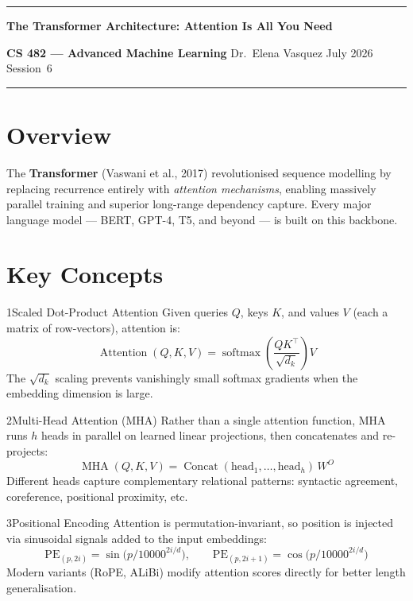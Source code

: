 \documentclass[11pt,a4paper]{article}
\newcommand{\handoutheader}[5]{%
  {\color{accent}\rule{\linewidth}{1.5pt}}\par\vspace{4pt}
  {\fontsize{16}{19}\selectfont\bfseries\color{neutral}#2}\par\vspace{3pt}
  \begingroup\small\color{neutral}
    \faUniversity\enspace\textbf{#1}\quad
    \faUser\enspace#3\quad
    \faCalendar\enspace#4\quad
    \faHashtag\enspace Session~#5
  \endgroup\par\vspace{4pt}
  {\color{accent}\rule{\linewidth}{0.6pt}}
  \vspace{6pt}
}
\begin{document}
\color{neutral}
\pagestyle{plain}

\handoutheader%
  {CS 482 — Advanced Machine Learning}%
  {The Transformer Architecture: Attention Is All You Need}%
  {Dr.\ Elena Vasquez}%
  {9 July 2026}%
  {6}

\section{Overview}

The \textbf{Transformer} (Vaswani et al., 2017) revolutionised sequence modelling
by replacing recurrence entirely with \emph{attention mechanisms}, enabling
massively parallel training and superior long-range dependency capture.
Every major language model — BERT, GPT-4, T5, and beyond — is built on this backbone.

\section{Key Concepts}

\begin{keybox}{1\enspace Scaled Dot-Product Attention}
Given queries \(Q\), keys \(K\), and values \(V\) (each a matrix of row-vectors),
attention is:
\[
  \operatorname{Attention}(Q,K,V)
  = \operatorname{softmax}\!\left(\frac{QK^{\top}}{\sqrt{d_k}}\right)V
\]
The \(\sqrt{d_k}\) scaling prevents vanishingly small softmax gradients when the
embedding dimension is large.
\end{keybox}

\vspace{5pt}

\begin{keybox}{2\enspace Multi-Head Attention (MHA)}
Rather than a single attention function, MHA runs \(h\) heads in parallel on
learned linear projections, then concatenates and re-projects:
\[
  \operatorname{MHA}(Q,K,V)
  = \operatorname{Concat}(\mathrm{head}_1,\ldots,\mathrm{head}_h)\,W^{O}
\]
Different heads capture complementary relational patterns: syntactic agreement,
coreference, positional proximity, etc.
\end{keybox}

\vspace{5pt}

\begin{keybox}{3\enspace Positional Encoding}
Attention is permutation-invariant, so position is injected via sinusoidal signals
added to the input embeddings:
\[
  \mathrm{PE}_{(p,2i)}   = \sin\!\bigl(p/10000^{2i/d}\bigr),\qquad
  \mathrm{PE}_{(p,2i+1)} = \cos\!\bigl(p/10000^{2i/d}\bigr)
\]
Modern variants (RoPE, ALiBi) modify attention scores directly for better
length generalisation.
\end{keybox}
\end{document}
